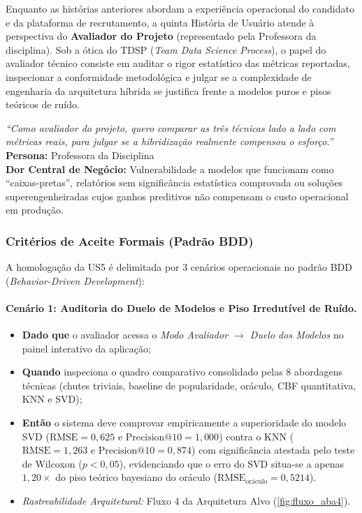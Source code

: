 Enquanto as histórias anteriores abordam a experiência operacional do candidato e da plataforma de recrutamento, a quinta História de Usuário atende à perspectiva do \textbf{Avaliador do Projeto} (representado pela Professora da disciplina). Sob a ótica do TDSP (\textit{Team Data Science Process}), o papel do avaliador técnico consiste em auditar o rigor estatístico das métricas reportadas, inspecionar a conformidade metodológica e julgar se a complexidade de engenharia da arquitetura híbrida se justifica frente a modelos puros e pisos teóricos de ruído.

\begin{tcolorbox}[colback=blue!5!white, colframe=blue!75!black, title={\textbf{User Story 5}}]
\textit{``Como avaliador do projeto, quero comparar as três técnicas lado a lado com métricas reais, para julgar se a hibridização realmente compensou o esforço.''}
\vspace{0.15cm}
\tcblower
\textbf{Persona:} Professora da Disciplina \\
\textbf{Dor Central de Negócio:} Vulnerabilidade a modelos que funcionam como ``caixas-pretas'', relatórios sem significância estatística comprovada ou soluções superengenheiradas cujos ganhos preditivos não compensam o custo operacional em produção.
\end{tcolorbox}

\subsubsection{Critérios de Aceite Formais (Padrão BDD)}

A homologação da US5 é delimitada por 3 cenários operacionais no padrão BDD (\textit{Behavior-Driven Development}):

\paragraph{Cenário 1: Auditoria do Duelo de Modelos e Piso Irredutível de Ruído.}
\begin{itemize}[leftmargin=1.5em, itemsep=2pt]
    \item \textbf{Dado que} o avaliador acessa o \textit{Modo Avaliador $\to$ Duelo dos Modelos} no painel interativo da aplicação;
    \item \textbf{Quando} inspeciona o quadro comparativo consolidado pelas 8 abordagens técnicas (chutes triviais, baseline de popularidade, oráculo, CBF quantitativa, KNN e SVD);
    \item \textbf{Então} o sistema deve comprovar empiricamente a superioridade do modelo SVD ($\text{RMSE} = 0{,}625$ e $\text{Precision@10} = 1{,}000$) contra o KNN ($\text{RMSE} = 1{,}263$ e $\text{Precision@10} = 0{,}874$) com significância atestada pelo teste de Wilcoxon ($p < 0{,}05$), evidenciando que o erro do SVD situa-se a apenas $1{,}20\times$ do piso teórico bayesiano do oráculo ($\text{RMSE}_{\text{oráculo}} = 0{,}5214$).
    \item \textit{Rastreabilidade Arquitetural:} Fluxo 4 da Arquitetura Alvo (\ref{fig:fluxo_aba4}).
\end{itemize}

